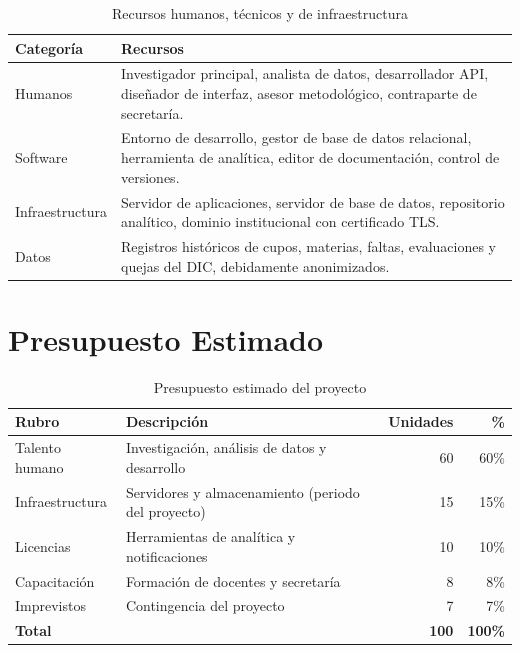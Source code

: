 \begin{table}[H]
\centering
\caption{Recursos humanos, técnicos y de infraestructura}
\label{tab:recursos}
\small
\begin{tabularx}{\textwidth}{@{}l X@{}}
\toprule
\rowcolor{verdeClaro}
\textbf{Categoría} & \textbf{Recursos} \\
\midrule
Humanos & Investigador principal, analista de datos, desarrollador \ac{API},
  diseñador de interfaz, asesor metodológico, contraparte de secretaría. \\
Software & Entorno de desarrollo, gestor de base de datos relacional,
  herramienta de analítica, editor de documentación, control de versiones. \\
Infraestructura & Servidor de aplicaciones, servidor de base de datos,
  repositorio analítico, dominio institucional con certificado TLS. \\
Datos & Registros históricos de cupos, materias, faltas, evaluaciones y
  quejas del \ac{DIC}, debidamente anonimizados. \\
\bottomrule
\end{tabularx}
\end{table}

\section{Presupuesto Estimado}

\begin{table}[H]
\centering
\caption{Presupuesto estimado del proyecto}
\label{tab:presupuesto}
\small
\begin{tabularx}{\textwidth}{@{}l X r r@{}}
\toprule
\rowcolor{azulClaro}
\textbf{Rubro} & \textbf{Descripción} & \textbf{Unidades} & \textbf{\%} \\
\midrule
Talento humano & Investigación, análisis de datos y desarrollo & 60 & 60\% \\
Infraestructura & Servidores y almacenamiento (periodo del proyecto) & 15 & 15\% \\
Licencias & Herramientas de analítica y notificaciones & 10 & 10\% \\
Capacitación & Formación de docentes y secretaría & 8 & 8\% \\
Imprevistos & Contingencia del proyecto & 7 & 7\% \\
\midrule
\rowcolor{grisClaro}
\textbf{Total} & & \textbf{100} & \textbf{100\%} \\
\bottomrule
\end{tabularx}
\end{table}

